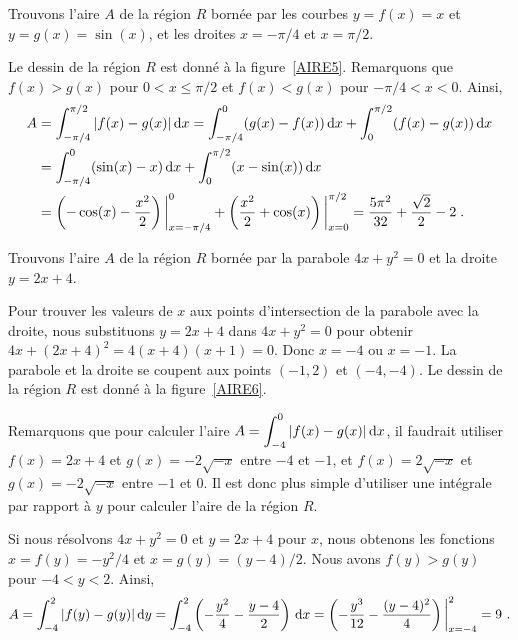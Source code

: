 {

\begin{egg}
Trouvons l'aire $A$ de la région $R$ bornée par les courbes $y=f(x)=x$ et
$y=g(x)=\sin(x)$, et les droites $x=-\pi/4$ et $x=\pi/2$.

Le dessin de la région $R$ est donné à la figure~\ref{AIRE5}.  Remarquons
que $f(x)>g(x)$ pour $0< x \leq \pi/2$ et $f(x)<g(x)$ pour $-\pi/4<x <0$. 
Ainsi,
\begin{align*}
A &= \int_{-\pi/4}^{\pi/2} |f(x)-g(x)|\,\mathrm{d}x = \int_{-\pi/4}^0 (g(x)-f(x))\,\mathrm{d}x
+ \int_0^{\pi/2} (f(x)-g(x))\,\mathrm{d}x \\
&= \int_{-\pi/4}^0 (\sin(x)-x) \,\mathrm{d}x + \int_0^{\pi/2}(x-\sin(x))\,\mathrm{d}x \\
&= \left( -\cos(x)- \frac{x^2}{2}\right)\bigg|_{x=-\pi/4}^0 +
\left( \frac{x^2}{2} + \cos(x) \right)\bigg|_{x=0}^{\pi/2}
= \frac{5\pi^2}{32} + \frac{\sqrt{2}}{2} - 2 \; .
\end{align*}
\end{egg}


\begin{egg}
Trouvons l'aire $A$ de la région $R$ bornée par la parabole $4x+y^2=0$ et
la droite $y=2x+4$.

Pour trouver les valeurs de $x$ aux points d'intersection de la parabole
avec la droite, nous substituons $y=2x+4$ dans $4x+y^2=0$ pour obtenir
$4x +(2x+4)^2 = 4(x+4)(x+1) = 0$.  Donc $x=-4$ ou $x=-1$.  La parabole
et la droite se coupent aux points $(-1,2)$ et $(-4,-4)$.  Le dessin
de la région $R$ est donné à la figure~\ref{AIRE6}.

Remarquons que pour calculer l'aire
$\displaystyle A = \int_{-4}^0 |f(x)-g(x)|\,\mathrm{d}x$, il faudrait utiliser
$f(x) = 2x+4$ et $g(x) = -2\sqrt{-x}$ entre $-4$ et $-1$, et
$f(x) = 2\sqrt{-x}$ et $g(x) = -2\sqrt{-x}$ entre $-1$ et $0$.  Il est donc
plus simple d'utiliser une intégrale par rapport à $y$ pour calculer l'aire
de la région $R$.

Si nous résolvons $4x+y^2=0$ et $y=2x+4$ pour $x$, nous obtenons les fonctions
$x=f(y) = -y^2/4$ et $x=g(y) = (y-4)/2$.  Nous avons $f(y)>g(y)$ pour
$-4< y < 2$.
Ainsi,
\[
A = \int_{-4}^2 |f(y)-g(y)|\,\mathrm{d}y =
\int_{-4}^2 \left( -\frac{y^2}{4} - \frac{y-4}{2} \right)\,\mathrm{d}x
= \left( -\frac{y^3}{12} - \frac{(y-4)^2}{4} \right)\bigg|_{x=-4}^2
= 9 \ .
\]
\end{egg}

}
